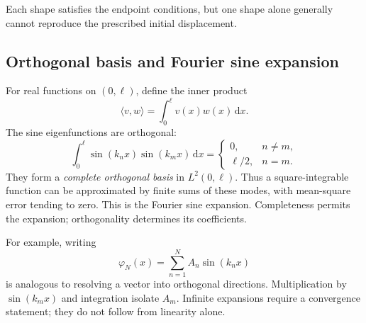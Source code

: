 \documentclass[11pt,a4paper]{article}
\newcommand{\dd}{\,\mathrm{d}}
\begin{document}
\begin{center}
\end{center}
Each shape satisfies the endpoint conditions, but one shape alone generally
cannot reproduce the prescribed initial displacement.

\subsection{Orthogonal basis and Fourier sine expansion}
For real functions on $(0,\ell)$, define the inner product
\begin{equation}
 \langle v,w\rangle=\int_0^\ell v(x)w(x)\dd x.
\end{equation}
The sine eigenfunctions are orthogonal:
\begin{equation}\label{eq:sineorthogonality}
 \int_0^\ell\sin(k_nx)\sin(k_mx)\dd x=
 \begin{cases}0,&n\ne m,\\ \ell/2,&n=m.\end{cases}
\end{equation}
They form a \emph{complete orthogonal basis} in $L^2(0,\ell)$. Thus a
square-integrable function can be approximated by finite sums of these modes,
with mean-square error tending to zero. This is the Fourier sine expansion.
Completeness permits the expansion; orthogonality determines its coefficients.

For example, writing
\begin{equation}
 \varphi_N(x)=\sum_{n=1}^NA_n\sin(k_nx)
\end{equation}
is analogous to resolving a vector into orthogonal directions. Multiplication
by $\sin(k_mx)$ and integration isolate $A_m$. Infinite expansions require a
convergence statement; they do not follow from linearity alone.
\end{document}
